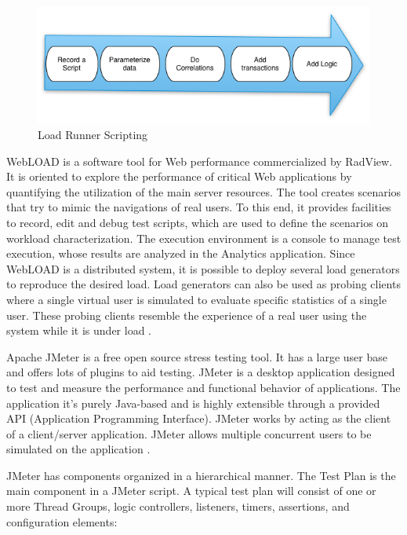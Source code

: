 \begin{figure}[!ht]
\centering
\includegraphics[width=1\textwidth]{./images/loadrunner.png}
\caption{Load Runner Scripting}
\label{fig:loadrunner}
\end{figure}



WebLOAD is a software tool for Web performance commercialized by RadView. It is oriented to explore the performance of critical Web applications by quantifying the utilization of the main server resources. The tool creates scenarios that try to mimic the navigations of real users. To this end, it provides facilities to record, edit and debug test scripts, which are used to define the scenarios on workload characterization. The execution environment is a console to manage test execution, whose results are analyzed in the Analytics application. Since WebLOAD is a distributed system, it is possible to deploy several load generators to reproduce the desired load. Load generators can also be used as probing clients where a single virtual user is simulated to evaluate specific statistics of a single user. These probing clients resemble the experience of a real user using the system while it is under load \cite{MohammadS.Obaidat}.

Apache JMeter is a free open source stress testing tool.  It has a large user base and offers lots of plugins to aid testing. JMeter is a desktop application designed to test and measure the performance and functional behavior of applications. The application it's purely Java-based and is highly extensible through a provided API (Application Programming Interface). JMeter works by acting as the client of a client/server application. JMeter allows multiple concurrent users to be simulated on the application \cite{Halili2008} \cite{Erinle2013}. 

JMeter has components organized  in a hierarchical manner. The Test Plan is the main component in a JMeter script. A typical test plan will consist of one or more Thread Groups, logic controllers, listeners, timers, assertions, and configuration elements:

